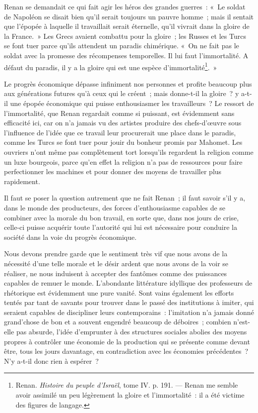 \documentclass[french,twoside]{book} %
\begin{document}
Renan se demandait ce qui fait agir les héros des grandes guerres : « Le soldat de Napoléon se disait bien qu’il serait toujours un pauvre homme ; mais il sentait que l’épopée à laquelle il travaillait serait éternelle, qu’il vivrait dans la gloire de la France. » Les Grecs avaient combattu pour la gloire ; les Russes et les Turcs se font tuer parce qu’ils attendent un paradis chimérique. « On ne fait pas le soldat avec la promesse des récompenses temporelles. Il lui faut l’immortalité. A défaut du paradis, il y a la gloire qui est une espèce d’immortalité\footnote{ \noindent Renan. \emph{Histoire du peuple d’Israël}, tome IV. p. 191. — Renan me semble avoir assimilé un peu légèrement la gloire et l’immortalité : il a été victime des figures de langage.
 }. »\par
Le progrès économique dépasse infiniment nos personnes et profite beaucoup plus aux générations futures qu’à ceux qui le créent ; mais donne-t-il la gloire ? y a-t-il une épopée économique qui puisse enthousiasmer  les travailleurs ? Le ressort de l’immortalité, que Renan regardait comme si puissant, est évidemment sans efficacité ici, car on n’a jamais vu des artistes produire des chefs-d’œuvre sous l’influence de l’idée que ce travail leur procurerait une place dans le paradis, comme les Turcs se font tuer pour jouir du bonheur promis par Mahomet. Les ouvriers n’ont même pas complètement tort lorsqu’ils regardent la religion comme un luxe bourgeois, parce qu’en effet la religion n’a pas de ressources pour faire perfectionner les machines et pour donner des moyens de travailler plus rapidement.\par
Il faut se poser la question autrement que ne fait Renan ; il faut savoir s’il y a, dans le monde des producteurs, des forces d’enthousiasme capables de se combiner avec la morale du bon travail, en sorte que, dans nos jours de crise, celle-ci puisse acquérir toute l’autorité qui lui est nécessaire pour conduire la société dans la voie du progrès économique.\par
Nous devons prendre garde que le sentiment très vif que nous avons de la nécessité d’une telle morale et le désir ardent que nous avons de la voir se réaliser, ne nous induisent à accepter des fantômes comme des puissances capables de remuer le monde. L’abondante littérature idyllique des professeurs de rhétorique est évidemment une pure vanité. Sont vains également les efforts tentés par tant de savants pour trouver dans le passé des institutions à imiter, qui seraient capables de discipliner leurs contemporains : l’imitation n’a jamais donné grand’chose de bon et a souvent engendré beaucoup de déboires ; combien n’est-elle pas absurde, l’idée d’emprunter à des structures sociales abolies des moyens propres à  contrôler une économie de la production qui se présente comme devant être, tous les jours davantage, en contradiction avec les économies précédentes ? N’y a-t-il donc rien à espérer ?\par
\end{document}
